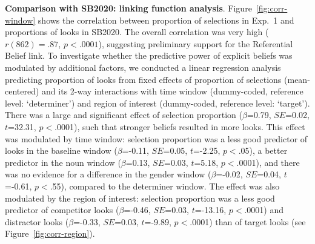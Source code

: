 \documentclass[10pt,letterpaper]{article}
\newcommand{\figref}[1]{Figure~\ref{#1}}
\newcommand{\expref}[1]{Exp.~#1}
\newcommand{\jd}[1]{\textcolor{Red}{\textbf{[jd: #1]}}}
\begin{document}
\textbf{Comparison with SB2020: linking function analysis}. \figref{fig:corr-window} shows the correlation between  proportion of selections in \expref{1} and proportions of looks in SB2020. The overall correlation was very high ($r(862) = .87$, $p < .0001$), suggesting preliminary support for the Referential Belief link. To investigate whether the predictive power of explicit beliefs was modulated by additional factors, we conducted a linear regression analysis %
predicting proportion of looks from fixed effects of proportion of selections (mean-centered) and its 2-way interactions with time window (dummy-coded, reference level: `determiner') and region of interest (dummy-coded, reference level: `target'). There was a large and significant effect of selection proportion  ($\beta$=0.79, $SE$=0.02, $t$=32.31, $p<$.0001), such that stronger beliefs resulted in more looks. This effect was modulated by time window: selection proportion was a less good predictor of looks in the baseline window   ($\beta$=-0.11, $SE$=0.05, $t$=-2.25, $p<$.05), a better predictor in the noun window   ($\beta$=0.13, $SE$=0.03, $t$=5.18, $p<$.0001), and there was no evidence for a difference in the gender window    ($\beta$=-0.02, $SE$=0.04, $t$=-0.61, $p<$.55), compared to the determiner window. The effect was also modulated by the region of interest: selection proportion was a less good predictor of competitor looks ($\beta$=-0.46, $SE$=0.03, $t$=-13.16, $p<$.0001) and distractor looks  ($\beta$=-0.33, $SE$=0.03, $t$=-9.89, $p<$.0001) than of target looks (see \figref{fig:corr-region}).


\end{document}
